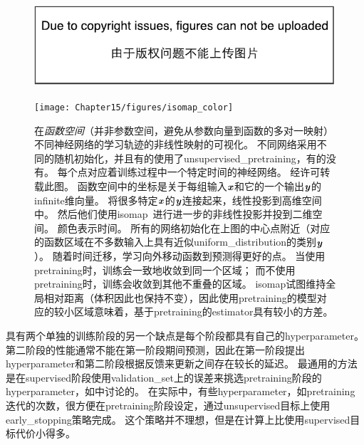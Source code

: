 

\begin{figure}[!htb]
\ifOpenSource
\centerline{\includegraphics{figure.pdf}}
\else
\centerline{\texttt{[image: Chapter15/figures/isomap\_color]}}
\fi
\caption{在\emph{函数空间}（并非参数空间，避免从参数向量到函数的多对一映射）不同神经网络的学习轨迹的非线性映射的可视化。
不同网络采用不同的随机初始化，并且有的使用了\gls{unsupervised_pretraining}，有的没有。
每个点对应着训练过程中一个特定时间的神经网络。
经\citet{Erhan+al-2010-small}许可转载此图。
函数空间中的坐标是关于每组输入$\boldsymbol{\mathit{x}}$和它的一个输出$\boldsymbol{\mathit{y}}$的\gls{infinite}维向量。
\cite{Erhan+al-2010-small}将很多特定$\boldsymbol{\mathit{x}}$的$\boldsymbol{\mathit{y}}$连接起来，线性投影到高维空间中。
然后他们使用\gls{isomap}~\citep{Tenenbaum2000-isomap}进行进一步的非线性投影并投到二维空间。
颜色表示时间。
所有的网络初始化在上图的中心点附近（对应的函数区域在不多数输入上具有近似\gls{uniform_distribution}的类别$\boldsymbol{\mathit{y}}$）。
随着时间迁移，学习向外移动函数到预测得更好的点。
当使用\gls{pretraining}时，训练会一致地收敛到同一个区域；
而不使用\gls{pretraining}时，训练会收敛到其他不重叠的区域。
\gls{isomap}试图维持全局相对距离（体积因此也保持不变），因此使用\gls{pretraining}的模型对应的较小区域意味着，基于\gls{pretraining}的\gls{estimator}具有较小的方差。
}
\label{fig:chap15_isomap}
\end{figure}



具有两个单独的训练阶段的另一个缺点是每个阶段都具有自己的\gls{hyperparameter}。
第二阶段的性能通常不能在第一阶段期间预测，因此在第一阶段提出\gls{hyperparameter}和第二阶段根据反馈来更新之间存在较长的延迟。
最通用的方法是在\gls{supervised}阶段使用\gls{validation_set}上的误差来挑选\gls{pretraining}阶段的\gls{hyperparameter}，如\cite{Larochelle-jmlr-2009}中讨论的。
在实际中，有些\gls{hyperparameter}，如\gls{pretraining}迭代的次数，很方便在\gls{pretraining}阶段设定，通过\gls{unsupervised}目标上使用\gls{early_stopping}策略完成。
这个策略并不理想，但是在计算上比使用\gls{supervised}目标代价小得多。


